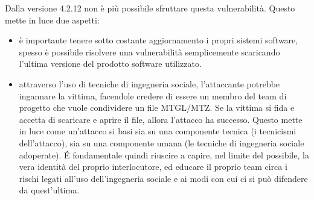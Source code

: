 \begin{flushleft}
Dalla versione 4.2.12 non è più possibile sfruttare questa vulnerabilità. Questo mette in luce due aspetti:

\begin{itemize}
    \item è importante tenere sotto costante aggiornamento i propri sistemi software, spesso è possibile risolvere una vulnerabilità semplicemente scaricando l'ultima versione del prodotto software utilizzato.
    
    \item attraverso l'uso di tecniche di ingegneria sociale, l'attaccante potrebbe ingannare la vittima, facendole credere di essere un membro del team di progetto che vuole condividere un file MTGL/MTZ. Se la vittima si fida e accetta di scaricare e aprire il file, allora l'attacco ha successo. Questo mette in luce come un'attacco si basi sia su una componente tecnica (i tecnicismi dell'attacco), sia su una componente umana (le tecniche di ingegneria sociale adoperate). \'E fondamentale quindi riuscire a capire, nel limite del possibile, la vera identità del proprio interlocutore, ed educare il proprio team circa i rischi legati all'uso dell'ingegneria sociale e ai modi con cui ci si può difendere da quest'ultima.
    
\end{itemize}

\end{flushleft}